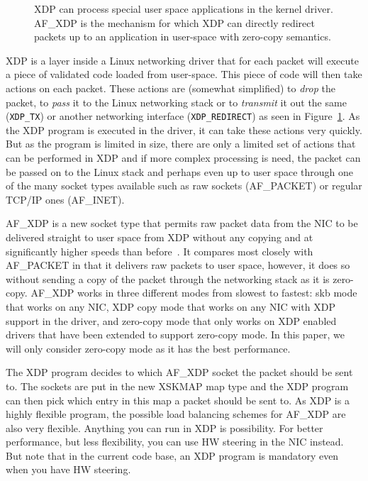 \documentclass[9pt,numbers,reprint]{sigplanconf}
\begin{document}
\begin{figure}[ht]
\resizebox{.5\textwidth}{!}{}
\caption{XDP can process special user space applications in the kernel
  driver. AF\_XDP is the mechanism for which XDP can directly redirect
  packets up to an application in user-space with zero-copy semantics.}
\label{fig:xdp}
\end{figure}

XDP is a layer inside a Linux networking driver that for each packet
will execute a piece of validated code loaded from
user-space. This piece of code will then take actions on each
packet. These actions are (somewhat simplified) to \emph{drop} the
packet, to \emph{pass} it to the Linux networking stack or to
\emph{transmit} it out the same ({\tt XDP\_TX}) or another networking
interface ({\tt XDP\_REDIRECT}) as seen in Figure~\ref{fig:xdp}. As the XDP
program is executed in the driver, it can take these actions
very quickly. But as the program is limited in size, there are only
a limited set of actions that can be performed in XDP and if more complex
processing is need, the packet can be passed on to the Linux stack and
perhaps even up to user space through one of the many socket types
available such as raw sockets (AF\_PACKET) or regular TCP/IP ones
(AF\_INET).

AF\_XDP is a new socket type that permits raw packet data from the NIC
to be delivered straight to user space from XDP without any copying
and at significantly higher speeds than before~\cite{af_packet_v4}. It
compares most closely with AF\_PACKET in that it delivers raw packets
to user space, however, it does so without sending a copy of the
packet through the networking stack as it is zero-copy. AF\_XDP works
in three different modes from slowest to fastest: skb mode that works
on any NIC, XDP copy mode that works on any NIC with XDP support in
the driver, and zero-copy mode that only works on XDP enabled drivers
that have been extended to support zero-copy mode. In this paper, we
will only consider zero-copy mode as it has the best performance.

The XDP program decides to which AF\_XDP socket the packet should be
sent to. The sockets are put in the new XSKMAP map type and the XDP
program can then pick which entry in this map a packet should be sent
to. As XDP is a highly flexible program, the possible load balancing
schemes for AF\_XDP are also very flexible. Anything you can run in
XDP is possibility. For better performance, but less flexibility, you
can use HW steering in the NIC instead. But note that in the current
code base, an XDP program is mandatory even when you have HW steering.
\end{document}
